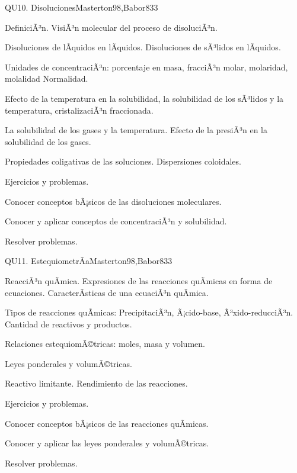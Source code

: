 \begin{syllabus}
\begin{unit}{QU10. Disoluciones}{Masterton98,Babor83}{3}
\begin{topics}
      \item DefiniciÃ³n. VisiÃ³n molecular del proceso de disoluciÃ³n.
      \item Disoluciones de lÃ­quidos en lÃ­quidos. Disoluciones de sÃ³lidos en lÃ­quidos.
      \item Unidades de concentraciÃ³n: porcentaje en masa, fracciÃ³n molar, molaridad, molalidad Normalidad.
      \item Efecto de la temperatura en la solubilidad, la solubilidad de los sÃ³lidos y la temperatura, cristalizaciÃ³n fraccionada.
      \item La solubilidad de los gases y la temperatura. Efecto  de la presiÃ³n en la solubilidad de los gases.
      \item Propiedades coligativas de las soluciones. Dispersiones coloidales.
      \item Ejercicios y problemas.
    \end{topics}

   \begin{unitgoals}
      \item Conocer conceptos bÃ¡sicos de las disoluciones moleculares.
      \item Conocer y aplicar conceptos de concentraciÃ³n y solubilidad.
      \item Resolver problemas.
   \end{unitgoals}
\end{unit}

\begin{unit}{QU11. EstequiometrÃ­a}{Masterton98,Babor83}{3}
\begin{topics}
      \item ReacciÃ³n quÃ­mica. Expresiones de las reacciones quÃ­micas en forma de ecuaciones. CaracterÃ­sticas de una ecuaciÃ³n quÃ­mica.
      \item Tipos de reacciones quÃ­micas: PrecipitaciÃ³n, Ã¡cido-base, Ã³xido-reducciÃ³n. Cantidad de reactivos y productos.
      \item Relaciones estequiomÃ©tricas: moles, masa y volumen.
      \item Leyes ponderales y volumÃ©tricas.
      \item Reactivo limitante. Rendimiento de las reacciones.
      \item Ejercicios y problemas.
    \end{topics}

   \begin{unitgoals}
      \item Conocer conceptos bÃ¡sicos de las reacciones quÃ­micas.
      \item Conocer y aplicar las leyes ponderales y volumÃ©tricas.
      \item Resolver problemas.
   \end{unitgoals}
\end{unit}

\begin{coursebibliography}
\end{coursebibliography}
\end{syllabus}
